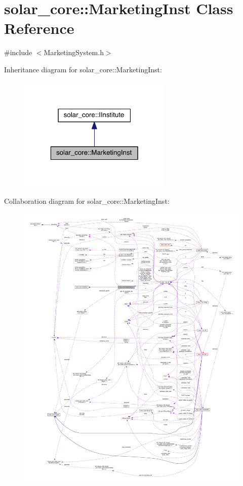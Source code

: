 \hypertarget{classsolar__core_1_1_marketing_inst}{}\section{solar\+\_\+core\+:\+:Marketing\+Inst Class Reference}
\label{classsolar__core_1_1_marketing_inst}


{\ttfamily \#include $<$Marketing\+System.\+h$>$}



Inheritance diagram for solar\+\_\+core\+:\+:Marketing\+Inst\+:\nopagebreak
\begin{figure}[H]
\begin{center}
\leavevmode
\includegraphics[width=208pt]{classsolar__core_1_1_marketing_inst__inherit__graph}
\end{center}
\end{figure}


Collaboration diagram for solar\+\_\+core\+:\+:Marketing\+Inst\+:
\nopagebreak
\begin{figure}[H]
\begin{center}
\leavevmode
\includegraphics[width=350pt]{classsolar__core_1_1_marketing_inst__coll__graph}
\end{center}
\end{figure}
